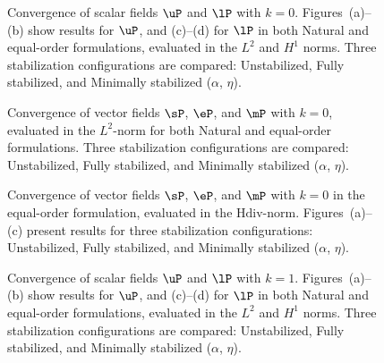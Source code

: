 
\begin{figure}[h!]
	\centering
	\caption{Convergence of scalar fields $\uP$ and $\lP$ with $k=0$. Figures~(a)--(b) show results for $\uP$, and (c)--(d) for $\lP$ in both Natural and equal-order formulations, evaluated in the $L^{2}$ and $H^{1}$ norms.   Three stabilization configurations are compared: Unstabilized, Fully stabilized, and Minimally stabilized ($\alpha$, $\eta$).
	}
	\def\svgwidth{1.0\columnwidth}
	
	\label{fig:convergence_scalar_linear}
\end{figure}


\begin{figure}[h!]
	\centering
	\caption{Convergence of vector fields $\sP$, $\eP$, and $\mP$ with $k=0$, evaluated in the $L^{2}$-norm for both Natural and equal-order formulations. Three stabilization configurations are compared: Unstabilized, Fully stabilized, and Minimally stabilized ($\alpha$, $\eta$).
	}
	\def\svgwidth{1.0\columnwidth}
	
	\label{fig:convergence_vector_linear}
\end{figure}


\begin{figure}[h!]
	\centering
	\caption{Convergence of vector fields $\sP$, $\eP$, and $\mP$ with $k=0$ in the equal-order formulation, evaluated in the $\text{Hdiv}$-norm. Figures~(a)--(c) present results for three stabilization configurations: Unstabilized, Fully stabilized, and Minimally stabilized ($\alpha$, $\eta$).
	}
	\def\svgwidth{1.0\columnwidth}
	
	\label{fig:convergence_vector_linear_hdiv}
\end{figure}




\begin{figure}[h!]
	\centering
	\caption{Convergence of scalar fields $\uP$ and $\lP$ with $k=1$. Figures~(a)--(b) show results for $\uP$, and (c)--(d) for $\lP$ in both Natural and equal-order formulations, evaluated in the $L^{2}$ and $H^{1}$ norms.   Three stabilization configurations are compared: Unstabilized, Fully stabilized, and Minimally stabilized ($\alpha$, $\eta$).}
	\def\svgwidth{1.0\columnwidth}
	
	\label{fig:convergence_scalar_quadratic}
\end{figure}


